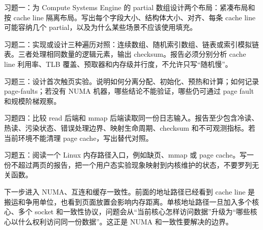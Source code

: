 \begin{exercisebox}
习题一：为 Compute Systems Engine 的 partial 数组设计两个布局：紧凑布局和按 cache line 隔离布局。写出每个字段大小、结构体大小、对齐、每条 cache line 可能容纳几个 partial，以及为什么某些场景不应该使用填充。

习题二：实现或设计三种遍历对照：连续数组、随机索引数组、链表或索引模拟链表。三者处理相同数量的逻辑元素，输出 checksum。报告必须分别分析 cache line 利用率、TLB 覆盖、预取器和内存级并行度，不允许只写“随机慢”。

习题三：设计首次触页实验。说明如何分离分配、初始化、预热和计算；如何记录 page-faults；若没有 NUMA 机器，哪些结论不能验证，哪些仍可通过 page fault 和规模阶梯观察。

习题四：比较 read 后端和 mmap 后端读取同一份日志输入。报告至少包含冷读、热读、污染状态、错误处理边界、映射生命周期、checksum 和不可观测指标。若当前环境不能清理 page cache，写出替代对照。

习题五：阅读一个 Linux 内存路径入口，例如缺页、mmap 或 page cache。写一份不超过两页的报告，把一个用户态实验现象映射到内核维护的状态，不要罗列无关函数。
\end{exercisebox}

下一步进入 NUMA、互连和缓存一致性。前面的地址路径已经看到 cache line 是搬运和争用单位，也看到页面放置会影响内存距离。单核地址路径一旦加入多个核心、多个 socket 和一致性协议，问题会从“当前核心怎样访问数据”升级为“哪些核心以什么权利访问同一份数据”。这正是 NUMA 和一致性要解决的边界。
